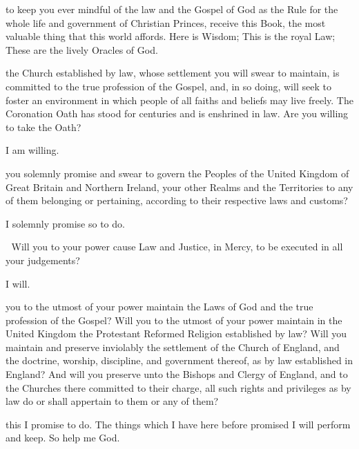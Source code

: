 { to keep you ever mindful of the law and the Gospel of God
as the Rule for the whole life and government of Christian Princes,
receive this Book,
the most valuable thing that this world affords.
Here is Wisdom;
This is the royal Law;
These are the lively Oracles of God.


\vfill 
\clearpage
{}



the Church established by law, whose settlement you will swear to
maintain, is committed to the true profession of the Gospel, and, in so
doing, will seek to foster an environment in which people of all faiths and
beliefs may live freely. The Coronation Oath has stood for centuries and is
enshrined in law.
Are you willing to take the Oath?

 I am willing.






 you solemnly promise and swear to govern the Peoples of the United
Kingdom of Great Britain and Northern Ireland, your other Realms and
the Territories to any of them belonging or pertaining, according to their
respective laws and customs?


I solemnly promise so to do.



 Will you to your power cause Law and Justice, in Mercy,
to be executed in all your judgements?


I will.


 you to the utmost of your power maintain the Laws of God and the
true profession of the Gospel? Will you to the utmost of your power
maintain in the United Kingdom the Protestant Reformed Religion
established by law? Will you maintain and preserve inviolably the
settlement of the Church of England, and the doctrine, worship, discipline,
and government thereof, as by law established in England? And will you
preserve unto the Bishops and Clergy of England, and to the Churches
there committed to their charge, all such rights and privileges as by law do
or shall appertain to them or any of them?



 this I promise to do.
The things which I have here before promised I will perform and keep.
So help me God.


}
